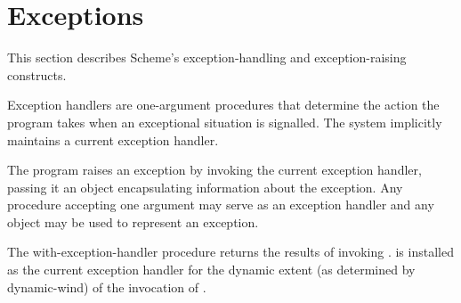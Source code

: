 \section{Exceptions}
\label{exceptionsection}

This section describes Scheme's exception-handling and
exception-raising constructs.

Exception handlers are one-argument procedures that determine the
action the program takes when an exceptional situation is signalled.
The system implicitly maintains a current exception handler.

The program raises an exception by
invoking the current exception handler, passing it an object
encapsulating information about the exception.  Any procedure
accepting one argument may serve as an exception handler and any
object may be used to represent an exception.

\begin{entry}{%
}

  The {\cf
with-exception-handler} procedure returns the results of invoking
.   is installed as the current
exception handler for the dynamic extent (as determined by {\cf
  dynamic-wind}) of the invocation of .


\end{entry}

